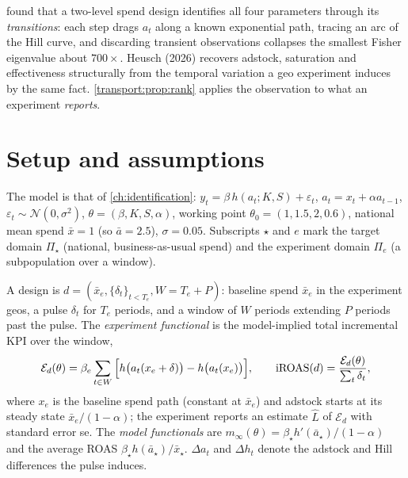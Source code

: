  found that a two-level spend design identifies all four parameters through its \emph{transitions}: each step drags $a_t$ along a known exponential path, tracing an arc of the Hill curve, and discarding transient observations collapses the smallest Fisher eigenvalue about $700\times$. Heusch (2026) recovers adstock, saturation and effectiveness structurally from the temporal variation a geo experiment induces by the same fact. \cref{transport:prop:rank} applies the observation to what an experiment \emph{reports}.

\section{Setup and assumptions}

The model is that of \cref{ch:identification}: $y_t = \beta\,h(a_t; K, S) + \varepsilon_t$, $a_t = x_t + \alpha a_{t-1}$, $\varepsilon_t \sim \mathcal N(0, \sigma^2)$, $\theta = (\beta, K, S, \alpha)$, working point $\theta_0 = (1, 1.5, 2, 0.6)$, national mean spend $\bar x = 1$ (so $\bar a = 2.5$), $\sigma = 0.05$. Subscripts $\star$ and $e$ mark the target domain $\Pi_\star$ (national, business-as-usual spend) and the experiment domain $\Pi_e$ (a subpopulation over a window).

\begin{definition}
\label{transport:def:design}
A design is $d = (\bar x_e, \{\delta_t\}_{t < T_e}, W = T_e + P)$: baseline spend $\bar x_e$ in the experiment geos, a pulse $\delta_t$ for $T_e$ periods, and a window of $W$ periods extending $P$ periods past the pulse. The \emph{experiment functional} is the model-implied total incremental KPI over the window,
\begin{equation}
\mathcal E_d(\theta) = \beta_e \sum_{t \in W}\Big[h\big(a_t(x_e + \delta)\big) - h\big(a_t(x_e)\big)\Big], \qquad
\mathrm{iROAS}(d) = \frac{\mathcal E_d(\theta)}{\sum_t \delta_t},
\label{eq:transport:Ed}
\end{equation}
where $x_e$ is the baseline spend path (constant at $\bar x_e$) and adstock starts at its steady state $\bar x_e/(1-\alpha)$; the experiment reports an estimate $\hat L$ of $\mathcal E_d$ with standard error se. The \emph{model functionals} are $m_\infty(\theta) = \beta_\star h'(\bar a_\star)/(1-\alpha)$ and the average ROAS $\beta_\star h(\bar a_\star)/\bar x_\star$. $\Delta a_t$ and $\Delta h_t$ denote the adstock and Hill differences the pulse induces.
\end{definition}

